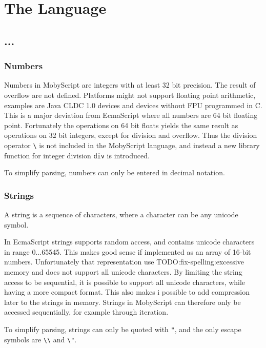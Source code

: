 \chapter{The Language}

\section{...}
\subsection{Numbers}
Numbers in MobyScript are integers with at least 32 bit precision.
The result of overflow are not defined.
Platforms might not support floating point arithmetic, examples are Java CLDC 1.0 devices and devices without FPU programmed in C.
This is a major deviation from EcmaScript where all numbers are 64 bit floating point. 
Fortunately the operations on 64 bit floats yields the same result as operations on 32 bit integers, except for division and overflow. 
Thus the division operator \verb|\| is not included in the MobyScript language, and
instead a new library function for integer division \verb|div| is introduced.

To simplify parsing, numbers can only be entered in decimal notation.

\subsection{Strings}

A string is a sequence of characters, where a character can be any unicode symbol. 

In EcmaScript strings supports random access, and contains unicode characters in range 0...65545.
This makes good sense if implemented as an array of 16-bit numbers. Unfortunately that representation use TODO:fix-spelling:excessive memory and does not support all unicode characters. 
By limiting the string access to be sequential, it is possible to support all unicode characters, while having a more compact format. 
This also makes i possible to add compression later to the strings in memory.
Strings in MobyScript can therefore only be accessed sequentially, for example through iteration.

To simplify parsing, strings can only be quoted with \verb|"|, and the only escape symbols are \verb|\\| and \verb|\"|.
